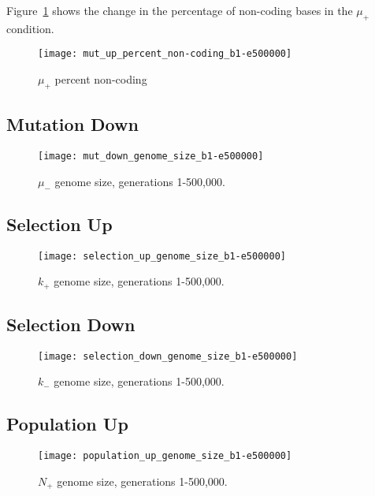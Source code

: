 Figure~\ref{fig:mut_up_percent_non-coding} shows the change in the percentage of non-coding bases in the $\mu_+$ condition. 

\begin{figure}[H]
	\centering
	\texttt{[image: mut\_up\_percent\_non-coding\_b1-e500000]}
	\caption[Mutation up - percent non-coding]{$\mu_+$ percent non-coding}
	\label{fig:mut_up_percent_non-coding}
\end{figure}

\subsection{Mutation Down}

\begin{figure}[H]
	\centering
	\texttt{[image: mut\_down\_genome\_size\_b1-e500000]}
	\caption[Mutation down genome size]{$\mu_-$ genome size, generations 1-500,000.}
	\label{fig:mut_down:genome_size}
\end{figure}

\subsection{Selection Up}

\begin{figure}[H]
	\centering
	\texttt{[image: selection\_up\_genome\_size\_b1-e500000]}
	\caption[Selection up genome size]{$k_+$ genome size, generations 1-500,000.}
	\label{fig:selection_up_genome_size}
\end{figure}

\subsection{Selection Down}

\begin{figure}[H]
	\centering
	\texttt{[image: selection\_down\_genome\_size\_b1-e500000]}
	\caption[Selection down genome size]{$k_-$ genome size, generations 1-500,000.}
	\label{fig:selection_down_genome_size}
\end{figure}

\subsection{Population Up}

\begin{figure}[H]
	\centering
	\texttt{[image: population\_up\_genome\_size\_b1-e500000]}
	\caption[Population up genome size]{$N_+$ genome size, generations 1-500,000.}
	\label{fig:pop_up_genome_size}
\end{figure}

